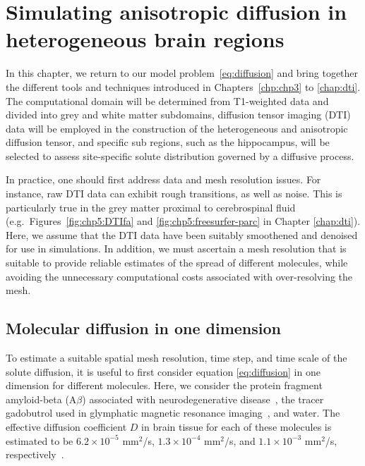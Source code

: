 \chapter{Simulating anisotropic diffusion in heterogeneous brain regions}
\label{chp:chp6}

In this chapter, we return to our model problem~\eqref{eq:diffusion}
and bring together the different tools and techniques introduced in
Chapters~\ref{chp:chp3} to \ref{chap:dti}. The computational domain will
be determined from T1-weighted data and divided into grey and white matter
subdomains, diffusion tensor imaging (DTI) data will be employed in the construction of the
heterogeneous and anisotropic diffusion tensor, and specific
sub regions, such as the hippocampus, will be selected to assess
site-specific solute distribution governed by a diffusive process.

In practice, one should first address data and mesh resolution
issues. For instance, raw DTI data can exhibit rough transitions, as
well as noise. This is particularly true in the grey matter proximal
to cerebrospinal fluid (e.g.~Figures~\ref{fig:chp5:DTIfa} and
\ref{fig:chp5:freesurfer-parc} in Chapter \ref{chap:dti}). Here, we assume that 
the DTI data have been suitably smoothened and denoised for use in simulations. In
addition, we must ascertain a mesh resolution that is suitable to
provide reliable estimates of the spread  of different
molecules, while avoiding the unnecessary computational costs
associated with over-resolving the mesh.

\section{Molecular diffusion in one dimension}
\label{sec:chp6:1D-tests}

To estimate a suitable spatial mesh resolution, time step, and time scale of the solute diffusion, it is useful to
first consider equation \eqref{eq:diffusion} in one dimension for different
molecules. Here, we consider the protein fragment amyloid-beta
(A$\beta$) associated with neurodegenerative
disease~\cite{iliff2012paravascular}, the tracer gadobutrol used in
glymphatic magnetic resonance imaging~\cite{ringstad2018brain}, and water. The
effective diffusion coefficient $D$ in brain tissue for each of these
molecules is estimated to be $6.2 \times 10^{-5}$ mm$^2$/s,
$1.3 \times 10^{-4}$ mm$^2$/s, and $1.1 \times 10^{-3}$ mm$^2$/s,
respectively~\cite{waters2010concentration,valnes2020apparent}.

